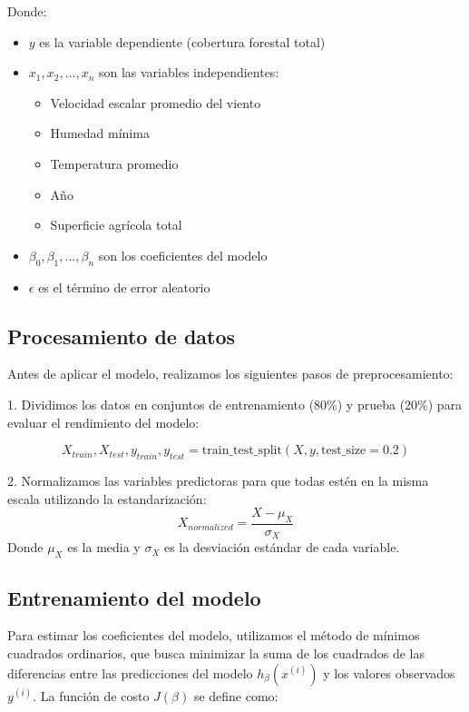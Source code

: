 \documentclass[11pt]{article}
\begin{document}
Donde:
\begin{itemize}
\item $y$ es la variable dependiente (cobertura forestal total)
\item $x_1, x_2, ..., x_n$ son las variables independientes:
  \begin{itemize}
  \item Velocidad escalar promedio del viento
  \item Humedad mínima
  \item Temperatura promedio
  \item Año
  \item Superficie agrícola total
  \end{itemize}
\item $\beta_0, \beta_1, ..., \beta_n$ son los coeficientes del modelo
\item $\epsilon$ es el término de error aleatorio
\end{itemize}

\subsection{Procesamiento de datos}

Antes de aplicar el modelo, realizamos los siguientes pasos de preprocesamiento:

1. Dividimos los datos en conjuntos de entrenamiento (80\%) y prueba (20\%) para evaluar el rendimiento del modelo:

\begin{equation}
X_{train}, X_{test}, y_{train}, y_{test} = \text{train\_test\_split}(X, y, \text{test\_size}=0.2)
\end{equation}

2. Normalizamos las variables predictoras para que todas estén en la misma escala utilizando la estandarización:
\begin{equation}
X_{normalized} = \frac{X - \mu_X}{\sigma_X}
\end{equation}
Donde $\mu_X$ es la media y $\sigma_X$ es la desviación estándar de cada variable.

\subsection{Entrenamiento del modelo}

Para estimar los coeficientes del modelo, utilizamos el método de mínimos cuadrados ordinarios, que busca minimizar la suma de los cuadrados de las diferencias entre las predicciones del modelo $h_\beta(x^{(i)})$ y los valores observados $y^{(i)}$. La función de costo $J(\beta)$ se define como:
\end{document}
